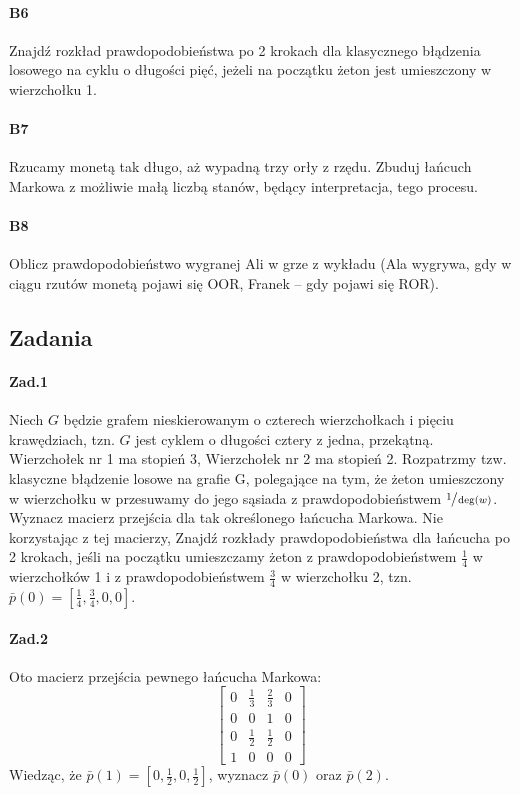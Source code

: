 \paragraph{B6} Znajdź rozkład prawdopodobieństwa po 2 krokach dla klasycznego błądzenia losowego na cyklu o długości pięć, jeżeli na początku żeton jest umieszczony w wierzchołku 1.

\paragraph{B7} Rzucamy monetą
tak długo, aż wypadną trzy orły z rzędu. Zbuduj łańcuch Markowa z możliwie małą liczbą stanów, będący interpretacja, tego procesu.

\paragraph{B8} Oblicz prawdopodobieństwo wygranej Ali w grze z wykładu (Ala wygrywa, gdy w ciągu rzutów monetą pojawi się OOR, Franek – gdy pojawi się ROR).

\subsection{Zadania}
\paragraph{Zad.1} Niech $G$ będzie grafem nieskierowanym o czterech wierzchołkach i pięciu krawędziach, tzn. $G$ jest cyklem o długości cztery z jedna, przekątną. Wierzchołek nr 1 ma stopień 3, Wierzchołek nr 2 ma stopień 2. Rozpatrzmy tzw. klasyczne błądzenie losowe na grafie G, polegające na tym, że żeton umieszczony w wierzchołku w przesuwamy do jego sąsiada z prawdopodobieństwem $\sfrac{1}{\deg (w)}$. Wyznacz macierz przejścia dla tak określonego łańcucha Markowa. Nie korzystając z tej macierzy, Znajdź rozkłady prawdopodobieństwa dla łańcucha po 2 krokach, jeśli na początku umieszczamy żeton z prawdopodobieństwem $\frac{1}{4}$ w wierzchołków 1 i z prawdopodobieństwem $\frac{3}{4}$ w wierzchołku 2, tzn. $\bar{p}(0) =\left[ \frac{1}{4}, \frac{3}{4}, 0, 0\right]$.

\paragraph{Zad.2} Oto macierz przejścia pewnego łańcucha Markowa: 
$$\begin{bmatrix}
0&\frac{1}{3}&\frac{2}{3}&0\\
0&0&1&0\\
0&\frac{1}{2}&\frac{1}{2}&0\\
1&0&0&0
\end{bmatrix}$$
Wiedząc, że $\bar{p}(1) = \left[0,\frac{1}{2}, 0,\frac{1}{2}\right]$, wyznacz $\bar{p}(0)$ oraz $\bar{p}(2)$.

